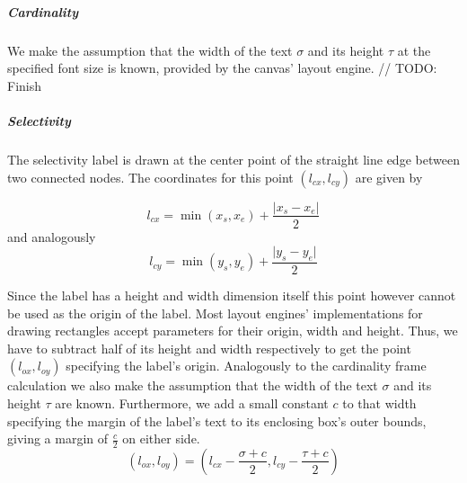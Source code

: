 \subparagraph{Cardinality} We make the assumption that the width of the text $\sigma$ and its height $\tau$ at the specified font size is known, provided by the canvas' layout engine.
// TODO: Finish

\subparagraph{Selectivity}
The selectivity label is drawn at the center point of the straight line edge between two connected nodes. The coordinates for this point $(l_{cx}, l_{cy})$ are given by

\begin{equation}
    l_{cx} = \min{(x_s, x_e)} + \frac{\vert x_s - x_e \vert}{2}
\end{equation}
and analogously
\begin{equation}
    l_{cy} = \min{(y_s, y_e)} + \frac{\vert y_s - y_e \vert}{2}
\end{equation}

Since the label has a height and width dimension itself this point however cannot be used as the origin of the label. Most layout engines' implementations for drawing rectangles accept parameters for their origin, width and height. Thus, we have to subtract half of its height and width respectively to get the point $(l_{ox}, l_{oy})$ specifying the label's origin. Analogously to the cardinality frame calculation we also make the assumption that the width of the text $\sigma$ and its height $\tau$ are known. Furthermore, we add a small constant $c$ to that width specifying the margin of the label's text to its enclosing box's outer bounds, giving a margin of $\frac{c}{2}$ on either side.
\begin{equation}
    (l_{ox}, l_{oy}) = (l_{cx} - \frac{\sigma + c}{2}, l_{cy} - \frac{\tau + c}{2})
\end{equation}




